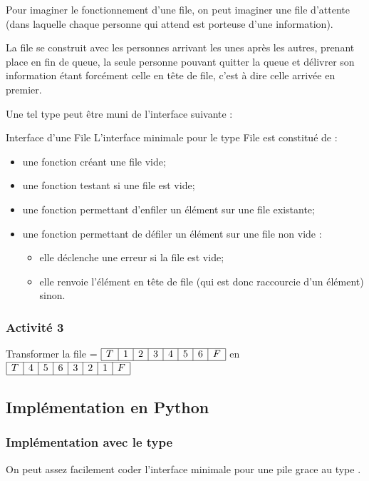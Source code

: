 \documentclass[11pt,a4paper,french,twoside]{PMCours}
\begin{document}
\medskip
Pour imaginer le fonctionnement d'une file, on peut imaginer une file d'attente (dans laquelle chaque personne qui attend est porteuse d'une information).

La file se construit avec les personnes arrivant les unes après les autres, prenant place en fin de queue, la seule personne pouvant quitter la queue et délivrer son information étant forcément celle en tête de file, c'est à dire celle arrivée en premier.

Une tel type peut être muni de l'interface suivante :

\medskip
\begin{Definition}{Interface d'une File}
L'interface minimale pour le type File est constitué de :
\begin{itemize}
\item une fonction créant une file vide; 
\item une fonction testant si une file est vide;
\item une fonction permettant d'enfiler un élément sur une file existante;
\item une fonction permettant de défiler un élément sur une file non vide : 
\begin{itemize}
\item elle déclenche une erreur si la file est vide;
\item elle renvoie l'élément en tête de file (qui est donc raccourcie d'un élément) sinon.
\end{itemize}
\end{itemize}
\end{Definition}
\subsubsection*{Activité 3}
Transformer la file \hskip 5mm = {\footnotesize$\begin{array}{|c|c|c|c|c|c|c|c|}\hline
T&1&2&3&4&5&6&F\\\hline\end{array}$}\hskip 5mm  en \hskip 5mm 
{\footnotesize$\begin{array}{|c|c|c|c|c|c|c|c|}\hline
T&4&5&6&3&2&1&F\\\hline\end{array}$}
\newpage\noindent
\subsection{Implémentation en Python}
\subsubsection{Implémentation avec le type \texorpdfstring{}{list}}
On peut assez facilement coder l'interface minimale pour une pile grace au type 
. 
\end{document}
